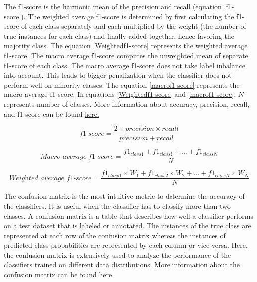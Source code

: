 The f1-score is the harmonic mean of the precision and recall (equation \ref{f1-score}). The weighted average f1-score is determined by first calculating the f1-score of each class separately and each multiplied by the weight (the number of true instances for each class) and finally added together, hence favoring the majority class. The equation \ref{Weightedf1-score} represents the weighted average f1-score. The macro average f1-score computes the unweighted mean of separate f1-score of each class. The macro average f1-score does not take label inbalance into account. This leads to bigger penalization when the classifier does not perform well on minority classes. The equation \ref{macrof1-score} represents the macro average f1-score. In equations \ref{Weightedf1-score} and \ref{macrof1-score}, $N$ represents number of classes. More information about accuracy, precision, recall, and f1-score can be found \href{https://en.wikipedia.org/wiki/Precision_and_recall}{here\footnotemark.}


\begin{equation}\label{f1-score}
\textit{f1-score} = \frac{2 \times precision \times recall}{precision + recall}
\end{equation}


\begin{equation}\label{macrof1-score} 
\textit{Macro average f1-score} =  \frac{f1_{class1} + f1_{class2}+ ... + f1_{classN}}{N}
\end{equation}


\begin{equation}\label{Weightedf1-score} 
\textit{Weighted average f1-score} =  \frac{f1_{class1} \times W_1 + f1_{class2} \times W_2 + ... + f1_{classN} \times W_N}{N}
\end{equation}



The confusion matrix is the most intuitive metric to determine the accuracy of the classifiers. It is useful when the classifier has to classify more than two classes. A confusion matrix is a table that describes how well a classifier performs on a test dataset that is labeled or annotated. The instances of the true class are represented at each row of the confusion matrix whereas the instances of predicted class probabilities are represented by each column or vice versa. Here, the confusion matrix is extensively used to analyze the performance of the classifiers trained on different data distributions. More information about the confusion matrix can be found \href{https://en.wikipedia.org/wiki/Confusion_matrix}{here}\footnotemark.


